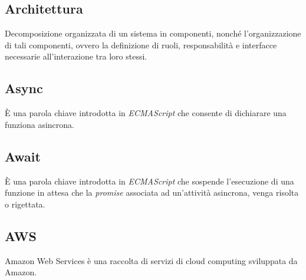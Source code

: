 \subsection{Architettura}
Decomposizione organizzata di un sistema in componenti, nonché l'organizzazione di tali componenti, ovvero la definizione di ruoli, responsabilità e interfacce necessarie all'interazione tra loro stessi.

\subsection{Async}
È una parola chiave introdotta in \textit{ECMAScript} che consente di dichiarare una funziona asincrona.

\subsection{Await}
È una parola chiave introdotta in \textit{ECMAScript} che sospende l'esecuzione di una funzione in attesa che la \textit{promise} associata ad un'attività asincrona, venga risolta o rigettata.

\subsection{AWS}
Amazon Web Services è una raccolta di servizi di cloud computing sviluppata da Amazon.